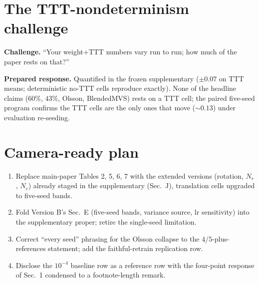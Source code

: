 \documentclass[10pt,letterpaper]{article}
\begin{document}
\section{The TTT-nondeterminism challenge}
\textbf{Challenge.} ``Your weight+TTT numbers vary run to run; how much of the paper
rests on that?''

\textbf{Prepared response.} Quantified in the frozen supplementary ($\pm0.07$ on TTT
means; deterministic no-TTT cells reproduce exactly). None of the headline claims
($60\%$, $43\%$, Olsson, BlendedMVS) rests on a TTT cell; the paired five-seed program
confirms the TTT cells are the only ones that move ($\sim0.13$) under evaluation
re-seeding.

\section{Camera-ready plan}
\begin{enumerate}\itemsep2pt
\item Replace main-paper Tables 2, 5, 6, 7 with the extended versions (rotation, $N_r$,
$N_c$) already staged in the supplementary (Sec.~J), translation cells upgraded to
five-seed bands.
\item Fold Version B's Sec.~E (five-seed bands, variance source, lr sensitivity) into
the supplementary proper; retire the single-seed limitation.
\item Correct ``every seed'' phrasing for the Olsson collapse to the $4$/$5$-plus-references
statement; add the faithful-retrain replication row.
\item Disclose the $10^{-4}$ baseline row as a reference row with the four-point
response of Sec.~1 condensed to a footnote-length remark.
\end{enumerate}
\end{document}

